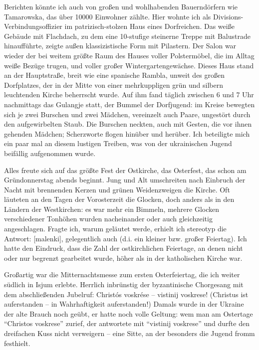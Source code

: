 Berichten könnte ich auch von großen und wohlhabenden Bauerndörfern wie Tamarowska, das über \num{10000} Einwohner zählte. Hier wohnte ich als Divisions-Verbindungsoffizier im patrizisch-stolzen Haus eines Dorfreichen. Das weiße Gebäude mit Flachdach, zu dem eine 10-stufige steinerne Treppe mit Balustrade hinaufführte, zeigte außen klassizistische Form mit Pilastern. Der Salon war wieder der bei weitem größte Raum des Hauses voller Polstermöbel, die im Alltag weiße Bezüge trugen, und voller großer Wintergartengewächse. Dieses Haus stand an der Hauptstraße, breit wie eine spanische Rambla, unweit des großen Dorfplatzes, der in der Mitte von einer mehrkuppligen grün und silbern leuchtenden Kirche beherrscht wurde. Auf ihm fand täglich zwischen 6 und 7 Uhr nachmittags das Gulangje statt, der Bummel der Dorfjugend: im Kreise bewegten sich je zwei Burschen und zwei Mädchen, vereinzelt auch Paare, ungestört durch den aufgewirbelten Staub. Die Burschen neckten, auch mit Gesten, die vor ihnen gehenden Mädchen; Scherzworte flogen hinüber und herüber. Ich beteiligte mich ein paar mal an diesem lustigen Treiben, was von der ukrainischen Jugend beifällig aufgenommen wurde.

Alles freute sich auf das größte Fest der Ostkirche, das Osterfest, das schon am Gründonnerstag abends beginnt. Jung und Alt umschreiten nach Einbruch der Nacht mit brennenden Kerzen und grünen Weidenzweigen die Kirche. Oft läuteten an den Tagen der Vorosterzeit die Glocken, doch anders als in den Ländern der Westkirchen: es war mehr ein Bimmeln, mehrere Glocken verschiedener Tonhöhen wurden nacheinander oder auch gleichzeitig angeschlagen. Fragte ich, warum geläutet werde, erhielt ich stereotyp die Antwort:  [malenki], gelegentlich auch  (d.i. ein kleiner bzw. großer Feiertag). Ich hatte den Eindruck, dass die Zahl der ostkirchlichen Feiertage, an denen nicht oder nur begrenzt gearbeitet wurde, höher als in der katholischen Kirche war.

Großartig war die Mitternachtsmesse zum ersten Osterfeiertag, die ich weiter südlich in Isjum erlebte. Herrlich inbrünstig der byzantinische Chorgesang mit dem abschließenden Jubelruf: Christós voskrése -- vistinij voskrese! (Christus ist auferstanden -- in Wahrhaftigkeit auferstanden!) Damals wurde in der Ukraine der alte Brauch noch geübt, er hatte noch volle Geltung: wem man am Ostertage \enquote{Christos voskrese} zurief, der antwortete mit \enquote{vistinij voskrese} und durfte den dreifachen Kuss nicht verweigern -- eine Sitte, an der besonders die Jugend fromm festhielt.

